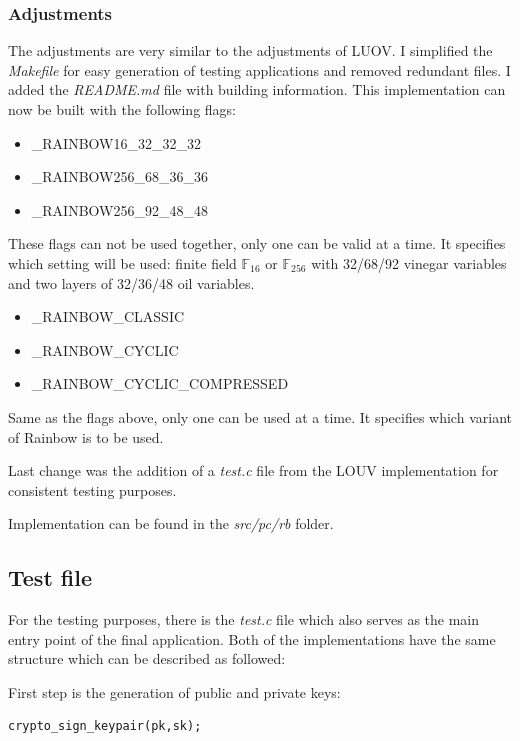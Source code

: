 \documentclass[thesis=M,english]{FITthesis}[2019/12/23]
\begin{document}
\subsubsection{Adjustments}
The adjustments are very similar to the adjustments of LUOV. I simplified the \textit{Makefile} for easy generation of testing applications and removed redundant files. I added the \textit{README.md} file with building information. This implementation can now be built with the following flags:

\begin{itemize}
\item	\_RAINBOW16\_32\_32\_32
\item	\_RAINBOW256\_68\_36\_36
\item	\_RAINBOW256\_92\_48\_48
\end{itemize}
These flags can not be used together, only one can be valid at a time. It specifies which setting will be used: finite field $\mathbb{F}_{16}$ or $\mathbb{F}_{256}$ with 32/68/92 vinegar variables and two layers of 32/36/48 oil variables.

\begin{itemize}
\item	\_RAINBOW\_CLASSIC
\item	\_RAINBOW\_CYCLIC
\item	\_RAINBOW\_CYCLIC\_COMPRESSED
\end{itemize}
Same as the flags above, only one can be used at a time. It specifies which variant of Rainbow is to be used.

\bigskip
\noindent
Last change was the addition of a \textit{test.c} file from the LOUV implementation for consistent testing purposes. 

\bigskip
\noindent
Implementation can be found in the \textit{src/pc/rb} folder.

\subsection{Test file}
For the testing purposes, there is the \textit{test.c} file which also serves as the main entry point of the final application. Both of the implementations have the same structure which can be described as followed:

\bigskip
\noindent
First step is the generation of public and private keys:
\begin{lstlisting}[frame=single]
crypto_sign_keypair(pk,sk);
\end{lstlisting}
\end{document}

